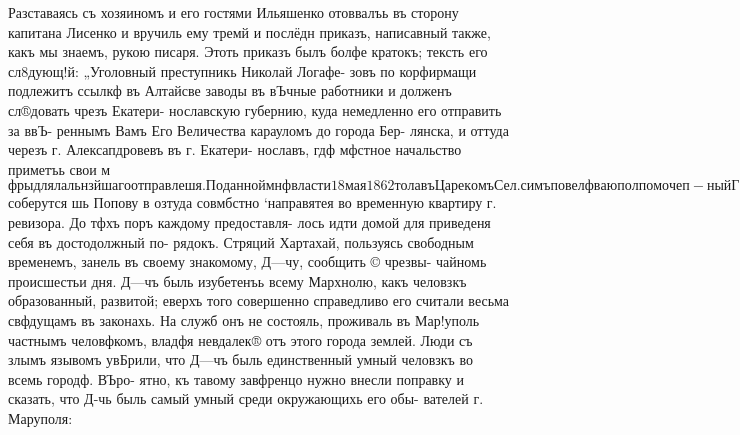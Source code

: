Разставаясь съ хозяиномъ и его гостями Ильяшенко
отоввалъь въ сторону капитана Лисенко и вручиль ему тремй
и послёдн приказъ, написавный также, какъ мы знаемъ,
рукою писаря. Этоть приказъ былъ болфе кратокъ; тексть
его сл8дующ!й: „Уголовный преступникь Николай Логафе-
зовъ по корфирмащи подлежитъ ссылкф въ Алтайсве заводы
въ вЪчные работники и долженъ сл®довать чрезъ Екатери-
нославскую губернию, куда немедленно его отправить за ввЪ-
реннымъ Вамъ Его Величества карауломъ до города Бер-
лянска, и оттуда черезъ г. Алексапдровевъ въ г. Екатери-
нославъ, гдф мфстное начальство приметъь свои м$фры для
лальнзйшаго отправлешя. По данной мнф власти 18 мая
1862 тола въ Царекомъ Сел. симъ повелфваю полпомочеп-
ный Государя моего и вфрноподданный Григорй Власовъ
Ильяшенко. Г. Маруполь, 6 апрфля 18683 года, зъ чаеъ
пополудни“. ,

Несмотря на выраженное ревизоромъ желан1, чтобы
никто пе утруждаль себя панесетемъ прощальнато визита,
Поповъ, тёмъ не менЪе, солидно разсуждая, что и излининее
усерме къ начальству только приносить’ пользу, тайно при-
казалъ своему кучеру замфтить домъ, у котораго остановился
начальникъ. Когда Ильяшенко разеталея съ Поповымъ, осталь-
пая компан, посовфтовавшись съ хозяиномт, рЬшила, что
общая явка къ внезапно прибывшему высокопоставленному
лицу безусловно необходима. ПорЪшили, что должны авиться
купно всЪ власти, имя во главф военную власть, капитана,
Лисенко; затЪмъ находили, что было бы весьма великолвоно,
если бы шестые властей замыгали главнЪйпие именитые
граждане г. Маруноля. Оповфетить послвднихъ обязались
члены суда, которые и не замедлили разбЪжаться по разнымъ
нонцамь города. Итакь было условлено, что часа черезъ два,
т. а. между тремя н четырьмя часами дня, ве$ соберутся
шь Попову в озтуда совмбстно ‘направятея во временную
квартиру г. ревизора. До тфхъ поръ каждому предоставля-
лось идти домой для приведеня себя въ достодолжный по-
рядокъ. Стряций Хартахай, пользуясь свободным временемъ,
занель въ своему знакомому, Д—чу, сообщить © чрезвы-
чайномь происшестьи дня. Д—чъ быль изубетенъь всему
Мархнолю, какъ человзкъ образованный, развитой; еверхъ
того совершенно справедливо его считали весьма свфдущамъ
въ законахь. На служб онъ не состояль, проживаль въ
Мар!уполь частнымъ человфкомъ, владфя невдалек® отъ этого
города землей. Люди съ злымъ язывомъ увБрили, что Д—чъ
быль единственный умный человзкъ во всемь городф. ВЪро-
ятно, къ тавому завфренцо нужно внесли поправку и сказать,
что Д-чь быль самый умный среди окружающихь его обы-
вателей г. Маруполя:


